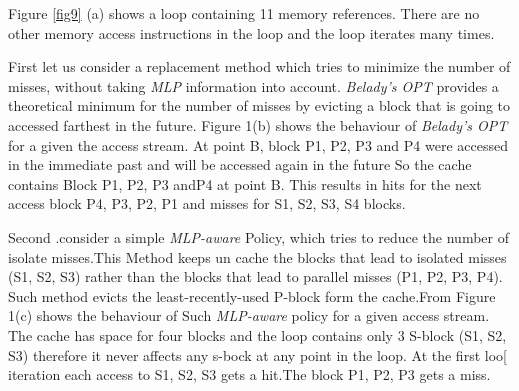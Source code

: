 \documentclass{report}
\begin{document}
\vspace{.8cm}
 Figure \ref{fig9} (a) shows a loop containing 11 memory references. There are no other memory access instructions in the loop and the loop iterates many times. 

\vspace{.8cm}
First let us consider a replacement method which tries to minimize the number of misses, without taking \emph{MLP} information into account. \emph{Belady's OPT} provides a theoretical minimum for the number of misses by evicting a block that is going to accessed farthest in the future.
Figure 1(b) shows the behaviour of \emph{Belady's OPT} for a given the access stream. At point B, block P1, P2, P3 and P4 were accessed in the immediate past and will be accessed again in the future So the cache contains Block P1, P2, P3 andP4 at point B. This results in hits for the next access block P4, P3, P2, P1 and misses for S1, S2, S3, S4 blocks.\vspace{.8cm}



Second .consider a simple \emph{MLP-aware} Policy, which tries to reduce the number of isolate misses.This Method keeps un cache the blocks that lead to isolated misses (S1, S2, S3) rather than the blocks that lead to parallel misses (P1, P2, P3, P4). Such method evicts the least-recently-used P-block form the cache.From Figure 1(c) shows the behaviour of Such \emph{MLP-aware} policy for a given access stream. The cache has space for four blocks and the loop contains only 3 S-block (S1, S2, S3) therefore it never affects any s-bock at any point in the loop. At the first loo[ iteration each access to S1, S2, S3 gets a hit.The block P1, P2, P3 gets a miss.
\vspace{.8cm}
\end{document}
